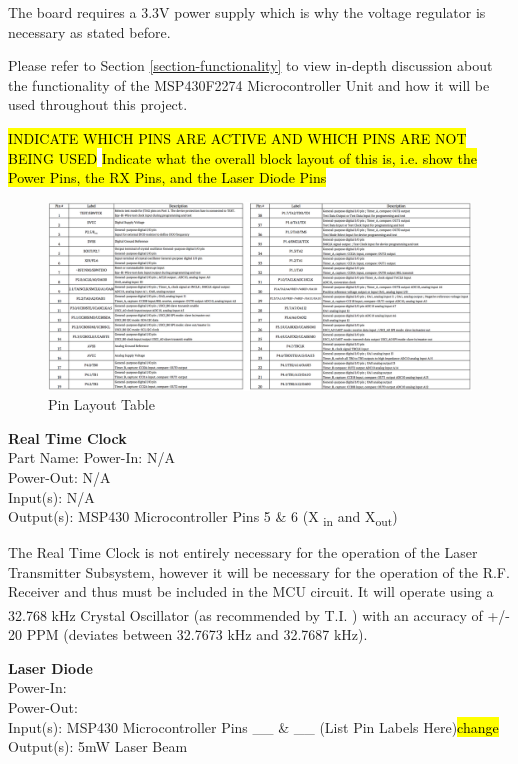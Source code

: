 \documentclass[letterpaper,10pt]{article}
\begin{document}
\begin{spacing}{1.15}
The board requires a 3.3V power supply which is why the voltage regulator is necessary as stated before.

Please refer to Section \ref{section-functionality} to view in-depth discussion about the functionality of the MSP430F2274 Microcontroller Unit and how it will be used throughout this project.

\hl{INDICATE WHICH PINS ARE ACTIVE AND WHICH PINS ARE NOT BEING USED}
\hl{Indicate what the overall block layout of this is, i.e. show the Power Pins, the RX Pins, and the Laser Diode Pins}
\begin{figure} [H]
	\centering
	\includegraphics[scale=0.40]{MSP430_Pin_Layout.png}
	\caption{Pin Layout Table\label{fig:msp430-pin-layout}}
\end{figure}

\normalsize\textbf{Real Time Clock}\\
Part Name: 
Power-In: N/A \\
Power-Out: N/A \\
Input(s): N/A \\
Output(s): MSP430 Microcontroller Pins 5 \& 6 (X \textsubscript{in} and X\textsubscript{out})

The Real Time Clock is not entirely necessary for the operation of the Laser Transmitter Subsystem, however it will be necessary for the operation of the R.F. Receiver and thus must be included in the MCU circuit. It will operate using a 32.768 kHz Crystal Oscillator (as recommended by T.I. \textsuperscript{\cite{RTC-Implementation}}) with an accuracy of +/- 20 PPM (deviates between 32.7673 kHz and 32.7687 kHz).

\normalsize\textbf{Laser Diode}\\
Power-In: \\
Power-Out: \\
Input(s): MSP430 Microcontroller Pins \_\_ \& \_\_ (List Pin Labels Here)\hl{change} \\
Output(s): 5mW Laser Beam 


\end{spacing}
\end{document}
